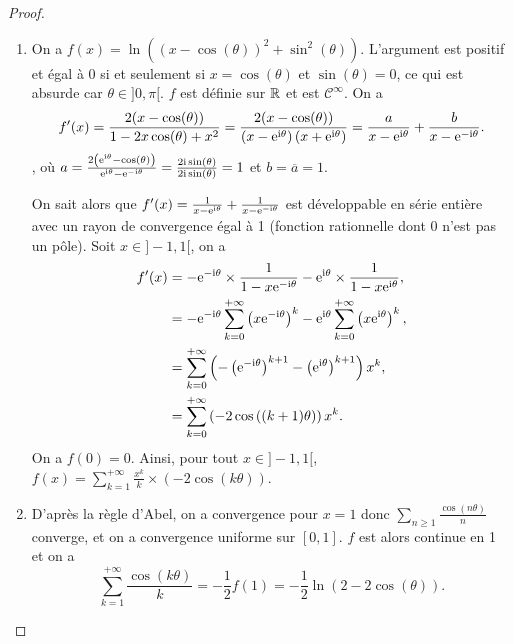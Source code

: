 \documentclass[12pt]{article}
\begin{document}
\begin{proof}
    \phantom{}
    \begin{enumerate}
        \item On a $f(x)=\ln\left(\left(x-\cos(\theta)\right)^{2}+\sin^{2}(\theta)\right)$. L'argument est positif et égal à 0 si et seulement si $x=\cos(\theta)$ et $\sin(\theta)=0$, ce qui est absurde car $\theta\in]0,\pi[$. $f$ est définie sur $\mathbb{R}$ et est $\mathcal{C}^{\infty}$.
        On a
        \begin{equation}
            f'(x)=\frac{2(x-\cos(\theta))}{1-2x\cos(\theta)+x^{2}}=\frac{2(x-\cos(\theta))}{\left(x-\mathrm{e}^{\mathrm{i}\theta}\right)\left(x+\mathrm{e}^{\mathrm{i}\theta}\right)}=\frac{a}{x-\mathrm{e}^{\mathrm{i}\theta}}+\frac{b}{x-\mathrm{e}^{-\mathrm{i}\theta}}.
        \end{equation},
        où $a=\frac{2\left(\mathrm{e}^{\mathrm{i}\theta}-\cos(\theta)\right)}{\mathrm{e}^{\mathrm{i}\theta}-\mathrm{e}^{-\mathrm{i}\theta}}=\frac{2\mathrm{i}\sin(\theta)}{2\mathrm{i}\sin(\theta)}=1$ et $b=\overline{a}=1$.

        On sait alors que $f'(x)=\frac{1}{x-\mathrm{e}^{\mathrm{i}\theta}}+\frac{1}{x-\mathrm{e}^{-\mathrm{i}\theta}}$ est développable en série entière avec un rayon de convergence égal à 1 (fonction rationnelle dont 0 n'est pas un pôle). Soit $x\in]-1,1[$, on a 
        \begin{align}
            f'(x)
            &=-\mathrm{e}^{-\mathrm{i}\theta}\times\frac{1}{1-x\mathrm{e}^{-\mathrm{i}\theta}}-\mathrm{e}^{\mathrm{i}\theta}\times\frac{1}{1-x\mathrm{e}^{\mathrm{i}\theta}},\\
            &=-\mathrm{e}^{-\mathrm{i}\theta}\sum_{k=0}^{+\infty}\left(x\mathrm{e}^{-\mathrm{i}\theta}\right)^{k}-\mathrm{e}^{\mathrm{i}\theta}\sum_{k=0}^{+\infty}\left(x\mathrm{e}^{\mathrm{i}\theta}\right)^{k},\\
            &=\sum_{k=0}^{+\infty}\left(-\left(\mathrm{e}^{-\mathrm{i}\theta}\right)^{k+1}-\left(\mathrm{e}^{\mathrm{i}\theta}\right)^{k+1}\right)x^{k},\\
            &=\sum_{k=0}^{+\infty}\left(-2\cos\left((k+1)\theta\right)\right)x^{k}.
        \end{align}
        On a $f(0)=0$. Ainsi, pour tout $x\in]-1,1[$, $f(x)=\sum_{k=1}^{+\infty}\frac{x^{k}}{k}\times\left(-2\cos(k\theta)\right)$.

        \item D'après la règle d'Abel, on a convergence pour $x=1$ donc $\sum_{n\geqslant1}\frac{\cos(n\theta)}{n}$ converge, et on a convergence uniforme sur $[0,1]$. $f$ est alors continue en 1 et on a 
        \begin{equation}
            \sum_{k=1}^{+\infty}\frac{\cos(k\theta)}{k}=-\frac{1}{2}f(1)=-\frac{1}{2}\ln\left(2-2\cos(\theta)\right).
        \end{equation}


\end{enumerate}
\end{proof}
\end{document}
